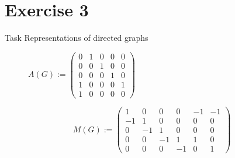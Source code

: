
\section{Exercise 3}

\setcounter{exercise}{1}

\begin{frame}[allowframebreaks]{Task \thesection}{Representations of directed graphs}
    \begin{exercisenoinc}
        \begin{figure}[H]
    \centering
    $A(G) :=
    \begin{pmatrix}
      0 & 1 & 0 & 0 & 0 \\ %
      0 & 0 & 1 & 0 & 0 \\ %
      0 & 0 & 0 & 1 & 0 \\ %
      1 & 0 & 0 & 0 & 1 \\ %
      1 & 0 & 0 & 0 & 0 %
    \end{pmatrix}$
\end{figure}
    \end{exercisenoinc}
    \begin{solution}
    \end{solution}
    \begin{solution}
        \[ M(G) := 
        \begin{pmatrix}
1 & 0 & 0 & 0 & -1 & -1 \\
-1 & 1 & 0 & 0 & 0 & 0 \\
0 & -1 & 1 & 0 & 0 & 0 \\
0 & 0 & -1 & 1 & 1 & 0 \\
0 & 0 & 0 & -1 & 0 & 1
        \end{pmatrix}
        \]
    \end{solution}
    \begin{solution}
    \end{solution}
\end{frame}